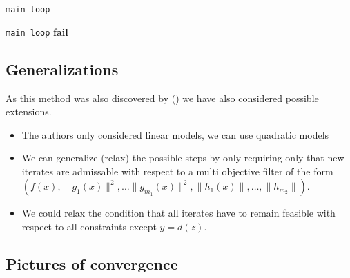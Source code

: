 \documentclass{article}
\begin{document}
\begin{algorithm}
\begin{algorithmic}[1]
				\State \Goto \texttt{main loop}
				\Else
				\EndIf

			\EndIf
		\Else
			\State \Goto \texttt{main loop}
		\EndIf
	\Else
			\textbf{fail}
		\EndIf
	\EndIf
\EndWhile
\EndProcedure
\end{algorithmic}
\end{algorithm}

\FloatBarrier

\subsection{Generalizations}

As this method was also discovered by () we have also considered possible extensions.

\begin{itemize}
\item The authors only considered linear models, we can use quadratic models
\item We can generalize (relax) the possible steps by only requiring only that new iterates are admissable with respect to a multi objective filter of the form $(f(x), \|g_1(x)\|^2, \ldots \|g_{m_1}(x)\|^2, \|h_1(x)\|, \ldots, \|h_{m_2}\|)$.
\item We could relax the condition that all iterates have to remain feasible with respect to all constraints except $y = d(z)$.
\end{itemize}

\subsection{Pictures of convergence}
\end{document}
